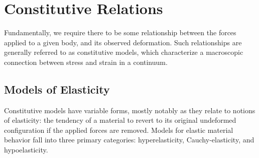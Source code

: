 \section{Constitutive Relations}

Fundamentally, we require there to be some relationship between the forces applied to a given body, and its observed deformation. Such relationships are generally referred to as constitutive models, which characterize a macroscopic connection between stress and strain in a continuum.

\subsection*{Models of Elasticity}

 Constitutive models have variable forms, mostly notably as they relate to notions of elasticity: the tendency of a material to revert to its original undeformed configuration if the applied forces are removed. Models for elastic material behavior fall into three primary categories: hyperelasticity, Cauchy-elasticity, and hypoelasticity.

